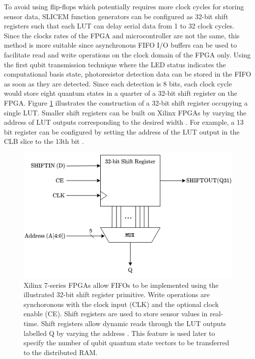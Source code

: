 To avoid using flip-flops which potentially requires more clock cycles for storing sensor data, SLICEM function generators can be configured as 32-bit shift registers such that each LUT can delay serial data from 1 to 32 clock cycles. Since the clocks rates of the FPGA and microcontroller are not the same, this method is more suitable since asynchronous FIFO I/O buffers can be used to facilitate read and write operations on the clock domain of the FPGA only. Using the first qubit transmission technique where the LED status indicates the computational basis state, photoresistor detection data can be stored in the FIFO as soon as they are detected. Since each detection is 8 bits, each clock cycle would store eight quantum states in a quarter of a 32-bit shift register on the FPGA. Figure \ref{fig:fifo-shift-register} illustrates the construction of a 32-bit shift register occupying a single LUT. Smaller shift registers can be built on Xilinx FPGAs by varying the address of LUT outputs corresponding to the desired width \cite{xilinx20167series}. For example, a 13 bit register can be configured by setting the address of the LUT output in the CLB slice to the 13th bit \cite{xilinx20167series}.
\begin{figure}[!ht]
	\centering
	\includegraphics[width=0.85\linewidth]{body/ch4/figs/fifo-shift-register}
	\caption[Xilinx 7-Series 32-bit Shift Register.]{Xilinx 7-series FPGAs allow FIFOs to be implemented using the illustrated 32-bit shift register primitive. Write operations are synchoronous with the clock input (CLK) and the optional clock enable (CE). Shift registers are used to store sensor values in real-time. Shift registers allow dynamic reads through the LUT outputs labelled Q by varying the address \cite{xilinx20167series}. This feature is used later to specify the number of qubit quantum state vectors to be transferred to the distributed RAM.}
	\label{fig:fifo-shift-register}
\end{figure}

